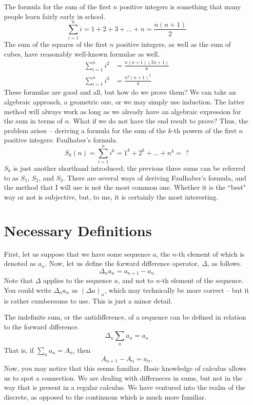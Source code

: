 \documentclass[a4paper]{article}
\theoremstyle{definition}
\begin{document}
The formula for the sum of the first $n$ positive integers is something that many people learn fairly early in school.
\begin{equation*}
    \sum_{i=1}^{n} i = 1 + 2 + 3 + \ldots + n = \frac{n(n+1)}{2}
\end{equation*}
The sum of the squares of the first $n$ positive integers, as well as the sum of cubes, have reasonably well-known formulae as well.
\begin{align*}
    \sum_{i=1}^{n} i^2 & = \frac{n(n+1)(2n+1)}{6} \\
    \sum_{i=1}^{n} i^3 & = \frac{n^2 (n+1)^2}{4}
\end{align*}
These formulae are good and all, but how do we prove them?
We can take an algebraic approach, a geometric one, or we may simply use induction.
The latter method will always work as long as we already have an algebraic expression for the sum in terms of $n$.
What if we do not have the end result to prove?
Thus, the problem arises -- deriving a formula for the sum of the $k$-th powers of the first $n$ positive integers: Faulhaber's formula.
\begin{equation*}
    S_k(n) = \sum_{i=1}^{n} i^k = 1^k + 2^k + ... + n^k = \text{ ?}
\end{equation*}
$S_k$ is just another shorthand introduced; the previous three sums can be referred to as $S_1$, $S_2$, and $S_3$.
There are several ways of deriving Faulhaber's formula, and the method that I will use is not the most common one.
Whether it is the ``best" way or not is subjective, but, to me, it is certainly the most interesting.

\section{Necessary Definitions}

First, let us suppose that we have some sequence $a$, the $n$-th element of which is denoted as $a_n$.
Now, let us define the forward difference operator, $\Delta$, as follows.
\begin{equation}
    \Delta_n a_n = a_{n+1} - a_n
\end{equation}
Note that $\Delta$ applies to the sequence $a$, and not to $n$-th element of the sequence.
You could write $\Delta_n a_n$ as $(\Delta a)_n$, which may technically be more correct -- but it is rather cumbersome to use.
This is just a minor detail.

The indefinite sum, or the antidifference, of a sequence can be defined in relation to the forward difference.
\begin{equation}
    \Delta_n \sum_n a_n = a_n
\end{equation}
That is, if $\sum_n a_n = A_n$, then
\begin{equation}
    A_{n+1} - A_n = a_n.
\end{equation}
Now, you may notice that this seems familiar.
Basic knowledge of calculus allows us to spot a connection.
We are dealing with differneces in sums, but not in the way that is present in a regular calculus.
We have ventured into the realm of the discrete, as opposed to the continuous which is much more familiar.
\end{document}
